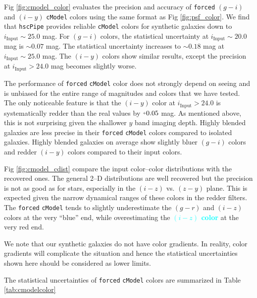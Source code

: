 \documentclass[useamsfonts]{pasj01}
\def\hscpipe{\texttt{hscPipe}}
\def\cmodel{\texttt{cModel}}
\def\forced{\texttt{forced}}
\newcommand{\song}[1]{\textcolor{cyan} {\textbf{#1}}}
\newcommand{\plus}{\raisebox{.4\height}{\scalebox{.6}{+}}}
\begin{document}
    Fig \ref{fig:cmodel_color} evaluates the precision and accuracy of \forced{} 
    $(g-i)$ and $(i-y)$ \cmodel{} colors using the same format as 
    Fig \ref{fig:psf_color}. 
    We find that \hscpipe{} provides reliable \cmodel{} colors for synthetic 
    galaxies down to $i_{\mathrm{Input}}{\sim}25.0$ mag.
    For $(g-i)$ colors, the statistical uncertainty at $i_{\mathrm{Input}}{\sim}20.0$ 
    mag is ${\sim}0.07$ mag.
    The statistical uncertainty increases to ${\sim}0.18$ mag at 
    $i_{\mathrm{Input}}{\sim}25.0$ mag.
    The $(i-y)$ colors show similar results, except the precision at 
    $i_{\mathrm{Input}}>24.0$ mag becomes slightly worse.

    The performance of \forced{} \cmodel{} color does not strongly depend on seeing 
    and is unbiased for the entire range of magnitudes and colors that we have tested.
    The only noticeable feature is that the $(i-y)$ color at $i_{\mathrm{Input}}>24.0$ 
    is systematically redder than the real values by $\plus0.05$ mag.
    As mentioned above, this is not surprising given the shallower $y$ band 
    imaging depth. 
    Highly blended galaxies are less precise in their \forced{} \cmodel{} colors 
    compared to isolated galaxies.  
    Highly blended galaxies on average show slightly bluer $(g-i)$ colors and redder  
    $(i-y)$ colors compared to their input colors.

    Fig \ref{fig:cmodel_cdist} compare the input color--color distributions with the
    recovered ones. 
    The general 2--D distributions are well recovered but the precision is not as 
    good as for stars, especially in the $(i-z)$ vs. $(z-y)$ plane.
    This is expected given the narrow dynamical ranges of these colors in the redder 
    filters.
    The \forced{} \cmodel{} tends to slightly underestimate the $(g-r)$ and $(i-z)$
    colors at the very ``blue'' end, while overestimating the \song{
    $(i-z)$ color}
    at the very red end.

    We note that our synthetic galaxies do not have color gradients.  
    In reality, color gradients will complicate the situation and hence the statistical 
    uncertainties shown here should be considered as lower limits.

	The statistical uncertainties of \forced{} \cmodel{} colors are summarized in 
	Table \ref{tab:cmodelcolor}
    
\end{document}
